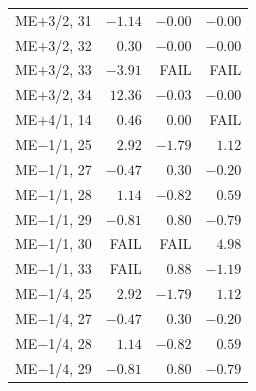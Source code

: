 \documentclass[compress]{beamer}
\begin{document}
\begin{frame}
\begin{columns}
\begin{tabular}{l r r r}
ME$+$3/2, 31 &  $-1.14$ &  $-0.00$ &  $-0.00$ \\
ME$+$3/2, 32 &  $ 0.30$ &  $-0.00$ &  $-0.00$ \\
ME$+$3/2, 33 &  $-3.91$ &  FAIL &  FAIL \\
ME$+$3/2, 34 &  $12.36$ &  $-0.03$ &  $-0.00$ \\
ME$+$4/1, 14 &  $ 0.46$ &  $ 0.00$ &  FAIL \\
ME$-$1/1, 25 &  $ 2.92$ &  $-1.79$ &  $ 1.12$ \\
ME$-$1/1, 27 &  $-0.47$ &  $ 0.30$ &  $-0.20$ \\
ME$-$1/1, 28 &  $ 1.14$ &  $-0.82$ &  $ 0.59$ \\
ME$-$1/1, 29 &  $-0.81$ &  $ 0.80$ &  $-0.79$ \\
ME$-$1/1, 30 &  FAIL &  FAIL &  $ 4.98$ \\
ME$-$1/1, 33 &  FAIL &  $ 0.88$ &  $-1.19$ \\
ME$-$1/4, 25 &  $ 2.92$ &  $-1.79$ &  $ 1.12$ \\
ME$-$1/4, 27 &  $-0.47$ &  $ 0.30$ &  $-0.20$ \\
ME$-$1/4, 28 &  $ 1.14$ &  $-0.82$ &  $ 0.59$ \\
ME$-$1/4, 29 &  $-0.81$ &  $ 0.80$ &  $-0.79$ \\
\end{tabular}
\end{columns}
\end{frame}
\end{document}
